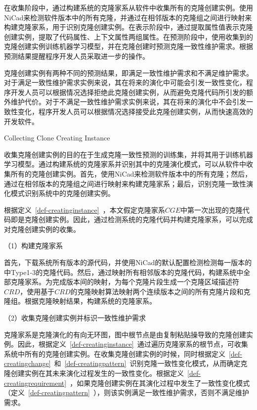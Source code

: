 在收集阶段中，通过构建系统的克隆家系从软件中收集所有的克隆创建实例。使用NiCad来检测软件版本中的所有克隆，并通过在相邻版本的克隆组之间进行映射来构建克隆家系，用于识别克隆创建实例。在表示阶段中，通过提取属性值表示克隆创建实例，提取了代码属性、上下文属性两组属性。在预测阶段中，使用收集到的克隆创建实例训练机器学习模型，并在克隆创建时预测克隆一致性维护需求。根据预测结果提醒程序开发人员采取进一步的操作。

克隆创建实例有两种不同的预测结果，即满足一致性维护需求和不满足维护需求。
对于满足一致性维护需求实例来说，其在将来的演化中可能会引发一致性变化，程序开发人员可以根据情况选择拒绝此克隆创建实例，从而避免克隆代码所引发的额外维护代价。对于不满足一致性维护需求实例来说，其在将来的演化中不会引发一致性变化，程序开发人员可以根据情况选择接受此克隆创建实例，从而快速高效的开发软件。

{Collecting Clone Creating Instance}
\label{lab-checkcopied}

收集克隆创建实例的目的在于生成克隆一致性预测的训练集，并将其用于训练机器学习模型。通过构建系统的克隆家系并识别其中的克隆演化模式，可以从软件中收集所有的克隆创建实例。首先，使用NiCad来检测软件版本中的所有克隆；然后，通过在相邻版本的克隆组之间进行映射来构建克隆家系；最后，识别克隆一致性演化模式识别系统中的克隆创建实例。

根据定义~\ref{def-creatinginstance}~，本文假定克隆家系$CGE$中第一次出现的克隆代码即是克隆创建实例。因此，通过检测系统的克隆代码并构建克隆家系，可以完成对克隆创建实例的收集。

（1）构建克隆家系

首先，下载系统所有版本的源代码，并使用NiCad的默认配置检测检测每一版本的中Type1-3的克隆代码。然后，通过映射所有相邻版本的克隆代码，构建系统中全部克隆家系。为完成版本间的映射，为每个克隆片段生成一个克隆区域描述符 $CRD$\cite{duala2010clone}，使用基于$CRD$的克隆映射算法映射两个连续版本之间的所有克隆片段和克隆组\cite{ci2013new}\cite{ci2013newD}。根据克隆映射结果，构建系统的克隆家系。

（2）收集克隆创建实例并标识一致性维护需求

克隆家系是克隆演化的有向无环图，图中根节点是由复制粘贴操导致的克隆创建实例。因此，根据定义~\ref{def-creatinginstance}~通过遍历克隆家系的根节点，可收集系统中所有的克隆创建实例。在收集克隆创建实例的时候，同时根据定义~\ref{def-creatingchange}~和~\ref{def-creatingpattern}~识别克隆一致性变化模式，从而确定克隆创建实例在其未来演化过程发生的一致性变化。根据定义~\ref{def-creatingrequirement}~，如果克隆创建实例在其演化过程中发生了一致性变化模式（定义~\ref{def-creatingpattern}~），则该实例满足一致性维护需求，否则不满足维护需求。

